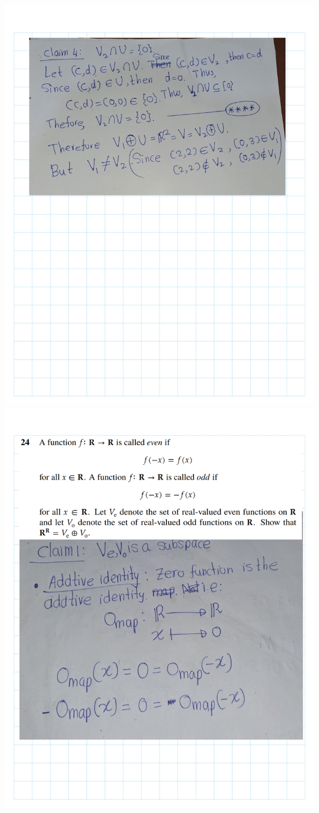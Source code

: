 \documentclass[
]{book}
\theoremstyle{definition}
\theoremstyle{definition}
\theoremstyle{definition}
\theoremstyle{definition}
\theoremstyle{remark}
\begin{document}
\begin{enumerate}
  \includegraphics{fig/Ex1C/Ex/Ex-30.png}
  \includegraphics{fig/Ex1C/Ex/Ex-31.png}

\end{enumerate}
\end{document}
